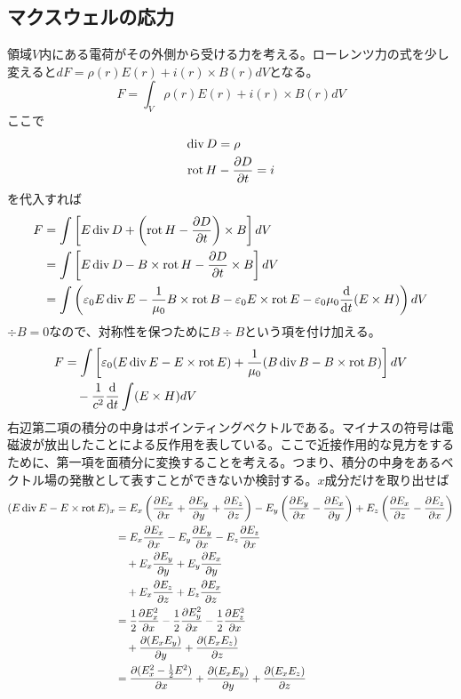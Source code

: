 \subsection{マクスウェルの応力}
    領域$V$内にある電荷がその外側から受ける力を考える。ローレンツ力の式を少し変えると$dF = \rho(r)E(r) + i(r) \times B(r) dV$となる。
        \[F = \int_V \rho(r)E(r) + i(r)\times B(r)dV\]
    ここで
    \begin{align*}
        \operatorname{div} D &= \rho\\
        \operatorname{rot} H &- \pdv{D}{t} = i
    \end{align*}
    を代入すれば
    \begin{align*}
        F   &= \int \left[E \operatorname{div} D + \left(\operatorname{rot} H - \pdv{D}{t}\right) \times B\right] dV\\
            &= \int \left[E \operatorname{div} D - B \times \operatorname{rot} H - \pdv{D}{t} \times B\right] dV\\
            &= \int \left(\varepsilon_0E \operatorname{div} E - \frac{1}{\mu_0}B \times \operatorname{rot} B - \varepsilon_0E \times \operatorname{rot} E - \varepsilon_0\mu_0\dv{t}(E \times H)\right) dV
    \end{align*}
    $\div B = 0$なので、対称性を保つために$B \div B$という項を付け加える。
    \begin{align*}
        F   &= \int \left[\varepsilon_0(E \operatorname{div} E - E \times \operatorname{rot} E) + \frac{1}{\mu_0}(B \operatorname{div} B - B \times \operatorname{rot} B)\right] dV\\
            &\quad - \frac{1}{c^2}\dv{t} \int (E \times H) dV
    \end{align*}
    右辺第二項の積分の中身はポインティングベクトルである。マイナスの符号は電磁波が放出したことによる反作用を表している。ここで近接作用的な見方をするために、第一項を面積分に変換することを考える。つまり、積分の中身をあるベクトル場の発散として表すことができないか検討する。$x$成分だけを取り出せば
    \begin{align*}
        (E\operatorname{div} E - E \times \operatorname{rot} E)_x
            &= E_x\left(\pdv{E_x}{x} + \pdv{E_y}{y} + \pdv{E_z}{z}\right) - E_y\left(\pdv{E_y}{x} - \pdv{E_x}{y}\right) + E_z\left(\pdv{E_x}{z} - \pdv{E_z}{x}\right)\\
            &= E_x\pdv{E_x}{x} - E_y\pdv{E_y}{x} - E_z\pdv{E_z}{x}\\
            &\quad + E_x\pdv{E_y}{y} + E_y\pdv{E_x}{y}\\
            &\quad + E_x\pdv{E_z}{z} + E_z\pdv{E_x}{z}\\
            &= \frac{1}{2}\pdv{E_x^2}{x} - \frac{1}{2}\pdv{E_y^2}{x} - \frac{1}{2}\pdv{E_z^2}{x}\\
            &\quad + \pdv{(E_xE_y)}{y} + \pdv{(E_xE_z)}{z}\\
            &= \pdv{(E_x^2 - \frac{1}{2}E^2)}{x} + \pdv{(E_xE_y)}{y} + \pdv{(E_xE_z)}{z}
    \end{align*}
